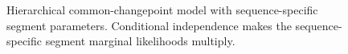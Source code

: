 \begin{figure}[!htbp]
  \centering
  \resizebox{0.96\columnwidth}{!}{}
  \caption{Hierarchical common-changepoint model with sequence-specific segment parameters. Conditional independence makes the sequence-specific segment marginal likelihoods multiply.}
  \label{fig:shared-boundary-paper}
\end{figure}
